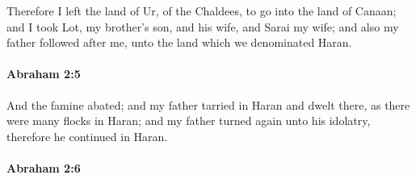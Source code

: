 			Therefore I left the land of Ur, of the Chaldees, to go into the land of Canaan; and I took Lot, my brother's son, and his wife, and Sarai my wife; and also my father followed after me, unto the land which we denominated Haran.


		\paragraph{Abraham 2:5} %
			\label{ABRAHAM-2-5}

			And the famine abated; and my father tarried in Haran and dwelt there, as there were many flocks in Haran; and my father turned again unto his idolatry, therefore he continued in Haran.


		\paragraph{Abraham 2:6} %
			\label{ABRAHAM-2-6}

